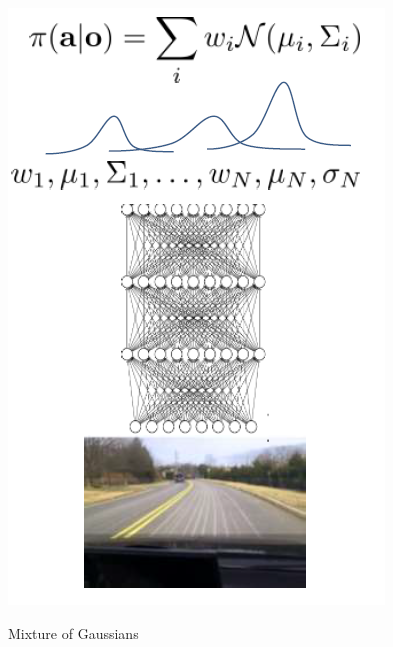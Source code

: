\documentclass[nobib]{tufte-handout}
\begin{document}
\begin{marginfigure}
  \centering
  \includegraphics[width=\linewidth]{mix-gaussian}
  \caption{Mixture of Gaussians}
  \label{fig:mix-gaussian}
\end{marginfigure}
\end{document}
